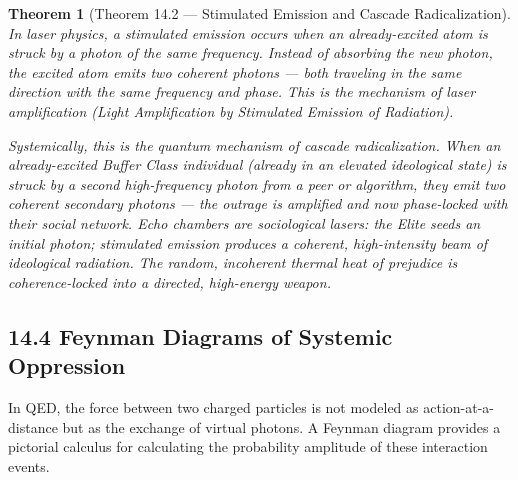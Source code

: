 \documentclass[12pt]{book}
\numberwithin{equation}{chapter}
\newtheorem{theorem}{Theorem}[chapter]
\begin{document}
\begin{theorem}[Theorem 14.2 — Stimulated Emission and Cascade Radicalization]
In laser physics, a \emph{stimulated emission} occurs when an already-excited atom is struck by a photon of the same frequency. Instead of absorbing the new photon, the excited atom emits \emph{two} coherent photons — both traveling in the same direction with the same frequency and phase. This is the mechanism of laser amplification (Light Amplification by Stimulated Emission of Radiation).
    \
\

    Systemically, this is the quantum mechanism of \emph{cascade radicalization}. When an already-excited Buffer Class individual (already in an elevated ideological state) is struck by a second high-frequency photon from a peer or algorithm, they emit two coherent secondary photons — the outrage is amplified and now phase-locked with their social network. Echo chambers are sociological lasers: the Elite seeds an initial photon; stimulated emission produces a coherent, high-intensity beam of ideological radiation. The random, incoherent thermal heat of prejudice is coherence-locked into a directed, high-energy weapon.
  \end{theorem}

\subsection{14.4 Feynman Diagrams of Systemic Oppression}

    In QED, the force between two charged particles is not modeled as action-at-a-distance but as the exchange of virtual photons. A Feynman diagram provides a pictorial calculus for calculating the probability amplitude of these interaction events.
  
\end{document}
